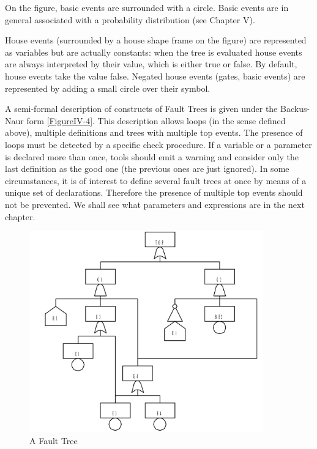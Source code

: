 \documentclass[11pt]{article}
\begin{document}
On the figure, basic events are surrounded with a circle. Basic events
are in general associated with a probability distribution (see Chapter
V).

House events (surrounded by a house shape frame on the figure) are
represented as variables but are actually constants: when the tree is
evaluated house events are always interpreted by their value, which is
either true or false. By default, house events take the value false.
Negated house events (gates, basic events) are represented by adding a
small circle over their symbol.

A semi-formal description of constructs of Fault Trees is given under
the Backus-Naur form \ref{FigureIV-4}. This description allows loops (in the
sense defined above), multiple definitions and trees with multiple top
events. The presence of loops must be detected by a specific check
procedure. If a variable or a parameter is declared more than once,
tools should emit a warning and consider only the last definition as the
good one (the previous ones are just ignored). In some circumstances, it
is of interest to define several fault trees at once by means of a
unique set of declarations. Therefore the presence of multiple top
events should not be prevented. We shall see what parameters and
expressions are in the next chapter.

\begin{figure}[htbp]

\includegraphics[width=0.9\textwidth]{./word/media/image5.png}
\caption{\label{fig:org66af9e4}
A Fault Tree}
\end{figure}
\end{document}
